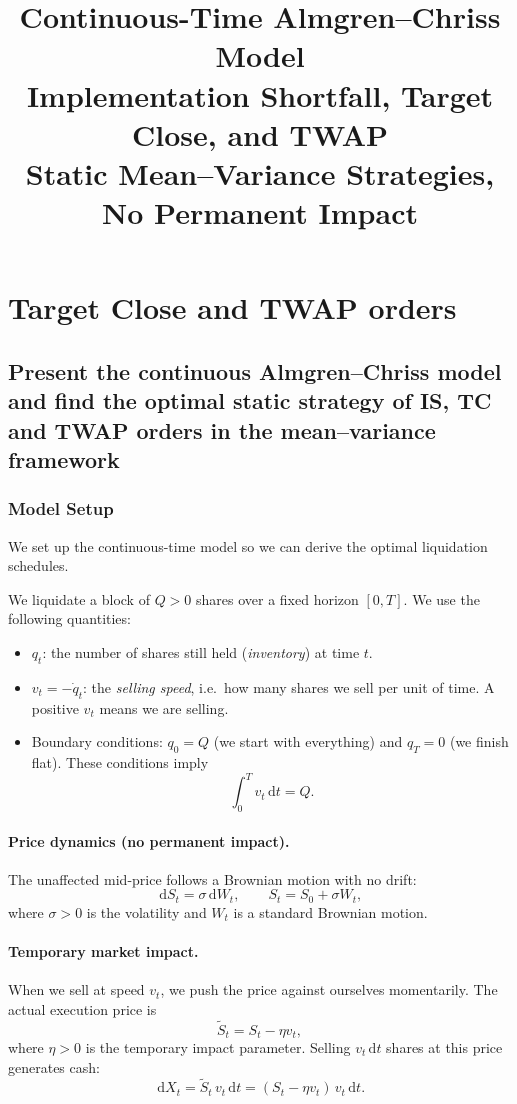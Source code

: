 \documentclass[12pt, a4paper]{article}
\title{%
  \textbf{\textcolor{accentblue}{Continuous-Time Almgren--Chriss Model}}\\[4pt]
  \large Implementation Shortfall, Target Close, and TWAP\\
  \normalsize Static Mean--Variance Strategies, No Permanent Impact\\[6pt]
}
\author{}
\date{}
\newcommand{\dd}{\,\mathrm{d}}
\begin{document}
\maketitle
\thispagestyle{empty}
\tableofcontents
\newpage

\section{Target Close and TWAP orders}
\subsection{Present the continuous Almgren--Chriss model and find the optimal static strategy of IS, TC and TWAP orders in the mean--variance framework}
\subsubsection{Model Setup}

We set up the continuous-time model so we can derive the optimal liquidation schedules.

We liquidate a block of $Q > 0$ shares over a fixed horizon $[0,T]$.
We use the following quantities:

\begin{itemize}[leftmargin=1.5em]
  \item $q_t$: the number of shares still held (\emph{inventory}) at time $t$.
  \item $v_t = -\dot q_t$: the \emph{selling speed}, i.e.\ how many shares we sell per unit of time.
    A positive $v_t$ means we are selling.
  \item Boundary conditions: $q_0 = Q$ (we start with everything) and $q_T = 0$ (we finish flat). These conditions imply
        \[
          \int_0^T v_t \dd t = Q.
        \]
\end{itemize}

\paragraph{Price dynamics (no permanent impact).}
The unaffected mid-price follows a Brownian motion with no drift:
\[
  \dd S_t = \sigma \dd W_t, \qquad S_t = S_0 + \sigma W_t,
\]
where $\sigma > 0$ is the volatility and $W_t$ is a standard Brownian motion.

\paragraph{Temporary market impact.}
When we sell at speed $v_t$, we push the price against ourselves momentarily.
The actual execution price is
\[
  \tilde S_t = S_t - \eta v_t,
\]
where $\eta > 0$ is the temporary impact parameter.
Selling $v_t \dd t$ shares at this price generates cash:
\[
  \dd X_t = \tilde S_t \, v_t \dd t = (S_t - \eta v_t)\,v_t \dd t.
\]
\end{document}
